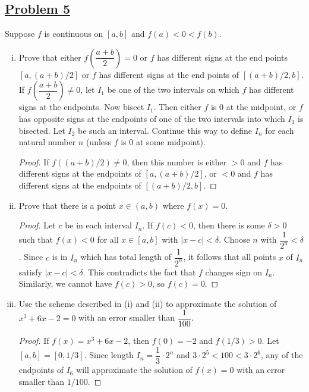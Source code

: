 \documentclass[10pt,letterpaper]{article}
\begin{document}
	\subsection*{{\color{purple}\underline{Problem 5}}}
	Suppose $f$ is continuous on $[a, b]$ and $f(a) < 0 < f(b)$.
	\begin{enumerate}[(i)]
	\item Prove that either $f(\dfrac{a+b}{2}) = 0$ or $f$ has different signs at the end points
	$[a, (a+b)/2]$ or $f$ has different signs at the end points of $[(a+b)/2, b]$. 
	If $f(\dfrac{a+b}{2}) \neq 0$, let $I_1$ be one of the two intervals on which $f$ 
	has different signs at the endpoints. Now bisect $I_1$. Then either $f$ is $0$ at the midpoint,
	or $f$ has opposite signs at the endpoints of one of the two intervals into which $I_1$ is
	bisected. Let $I_2$ be such an interval. Continue this way to define $I_n$ for each natural
	number $n$ (unless $f$ is 0 at some midpoint).
	\begin{proof}
	If $f((a+b)/2) \neq 0$, then this number is either $> 0$ and $f$ has different signs at the endpoints
	of $[a, (a+b)/2]$, or $< 0$ and $f$ has different signs at the endpoints of $[(a + b)/2,b]$.
	\end{proof}
	
	\item Prove that there is a point $x \in (a, b)$ where $f(x) = 0$.
	\begin{proof}
	Let $c$ be in each interval $I_n$. If $f(c) < 0$, then there is some $\delta > 0$
	such that $f(x) < 0$ for all $x \in [a, b]$ with $|x - c| < \delta$. Choose $n$
	with $\dfrac{1}{2^n} < \delta$. Since $c$ is in $I_n$ which has total length of
	$\dfrac{1}{2^n}$, it follows that all points $x$ of $I_n$ satisfy $|x - c| < \delta$.
	This contradicts the fact that $f$ changes sign on $I_n$. Similarly, we cannot have
	$f(c) > 0$, so $f(c) = 0$.
	\end{proof}
	
	\item Use the scheme described in (i) and (ii) to approximate the solution of
	$x^3 + 6x - 2 = 0$ with an error smaller than $\dfrac{1}{100}$.
	\begin{proof}
		If $f(x) = x^3 + 6x - 2$, then $f(0) = -2$ and $f(1/3) > 0$. Let $[a, b] = [0, 1/3]$. Since 
		length $I_n = \dfrac{1}{3} \cdot 2^n$ and $3 \cdot 2^5 < 100 < 3 \cdot 2^6$, any of the endpoints
		of $I_6$ will approximate the solution of $f(x) = 0$ with an error smaller than
		$1/100$.
	\end{proof}
	
	
	\end{enumerate}
	
\end{document}
